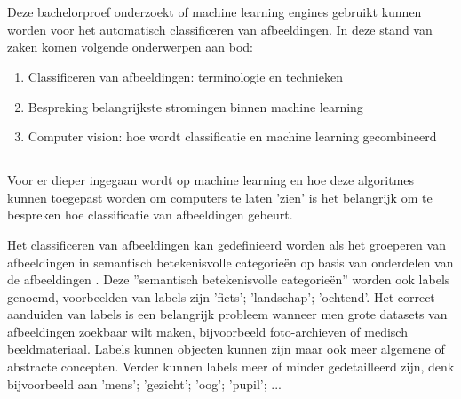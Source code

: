 \chapter{}
\label{ch:stand-van-zaken}


\section{}
\label{sec:standvanzaken-inleiding}

Deze bachelorproef onderzoekt of machine learning engines gebruikt kunnen worden voor het automatisch classificeren van afbeeldingen. In deze stand van zaken komen volgende onderwerpen aan bod:
\begin{enumerate}
    \item Classificeren van afbeeldingen: terminologie en technieken
    \item Bespreking belangrijkste stromingen binnen machine learning
    \item Computer vision: hoe wordt classificatie en machine learning gecombineerd
\end{enumerate}

\section{}
\label{sec:classificeren-van-afbeeldingen}
Voor er dieper ingegaan wordt op machine learning en hoe deze algoritmes kunnen toegepast worden om computers te laten 'zien' is het belangrijk om te bespreken hoe classificatie van afbeeldingen gebeurt.

Het classificeren van afbeeldingen kan gedefinieerd worden als het groeperen van afbeeldingen in semantisch betekenisvolle categorieën op basis van onderdelen van de afbeeldingen \autocite{Vailaya1998}. Deze ''semantisch betekenisvolle categorieën'' worden ook labels genoemd, voorbeelden van labels zijn 'fiets'; 'landschap'; 'ochtend'. Het correct aanduiden van labels is een belangrijk probleem wanneer men grote datasets van afbeeldingen zoekbaar wilt maken, bijvoorbeeld foto-archieven of medisch beeldmateriaal. Labels kunnen objecten kunnen zijn maar ook meer algemene of abstracte concepten. Verder kunnen labels meer of minder gedetailleerd zijn, denk bijvoorbeeld aan 'mens'; 'gezicht'; 'oog'; 'pupil'; ... 

